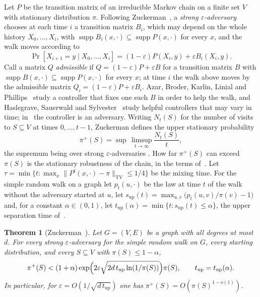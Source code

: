 \documentclass[11pt]{article}
\theoremstyle{remark}
\theoremstyle{plain}
\newtheorem{thmz}{Theorem}
\DeclareMathOperator{\supp}{supp}
\newcommand{\tup}{t_{\mathrm{up}}}
\begin{document}
Let $P$ be the transition matrix of an irreducible Markov chain on a finite set $V$ with stationary distribution
$\pi$. Following Zuckerman~\cite{Zu}, a \emph{strong $\varepsilon$-adversary} chooses at each time $i$ a transition
matrix $B_i$, which may depend on the whole history $X_0,\dots,X_i$, with $\supp B_i(x,\cdot)\subseteq\supp P(x,\cdot)$
for every $x$, and the walk moves according to
\[
\Pr[X_{i+1}=y\mid X_0,\dots,X_i]=(1-\varepsilon)P(X_i,y)+\varepsilon B_i(X_i,y).
\]
Call a matrix $Q$ \emph{admissible} if $Q=(1-\varepsilon)P+\varepsilon B$ for a transition matrix $B$ with
$\supp B(x,\cdot)\subseteq\supp P(x,\cdot)$ for every $x$; at time $i$ the walk above moves by the admissible matrix
$Q_i=(1-\varepsilon)P+\varepsilon B_i$. Azar, Broder, Karlin, Linial and Phillips~\cite{ABKLP} study a controller
that fixes one such $B$ in order to help the walk, and Haslegrave, Sauerwald and Sylvester~\cite{HSS} study helpful
controllers that may vary in time; in~\cite{Zu} the controller is an adversary. Writing $N_t(S)$ for the number of
visits to $S\subseteq V$ at times $0,\dots,t-1$, Zuckerman defines the upper stationary probability
\[
\pi^+(S)=\sup\,\limsup_{t\to\infty}\frac{N_t(S)}{t},
\]
the supremum being over strong $\varepsilon$-adversaries \cite[Definition~1.1]{Zu}. How far $\pi^+(S)$ can exceed
$\pi(S)$ is the stationary robustness of the chain, in the terms of~\cite[Section~1.2]{Zu}. Let
$\tau=\min\{t:\max_x\|P^t(x,\cdot)-\pi\|_{\mathrm{TV}}\le 1/4\}$ be the mixing time. For the simple random walk on a
graph let $p_t(u,\cdot)$ be the law at time $t$ of the walk without the adversary started at $u$, let
$s_{\mathrm{up}}(t)=\max_{u,v}\bigl(p_t(u,v)/\pi(v)-1\bigr)$ and, for a constant $\alpha\in(0,1)$, let
$\tup(\alpha)=\min\{t:s_{\mathrm{up}}(t)\le\alpha\}$, the upper separation time of~\cite[Definitions~2.6 and~2.7]{Zu}.

\begin{thmz}[{Zuckerman~\cite[Theorem~1.2]{Zu}}]\label{thm:zu}
Let $G=(V,E)$ be a graph with all degrees at most $d$. For every strong $\varepsilon$-adversary for the simple random
walk on $G$, every starting distribution, and every $S\subseteq V$ with $\pi(S)\le 1-\alpha$,
\[
\pi^+(S)<(1+\alpha)\exp\Bigl(2\varepsilon\sqrt{2d\,\tup\ln(1/\pi(S))}\Bigr)\pi(S),\qquad \tup=\tup(\alpha).
\]
In particular, for $\varepsilon=O(1/\sqrt{d\,\tup})$ one has $\pi^+(S)=O(\pi(S)^{1-o(1)})$.
\end{thmz}
\end{document}
